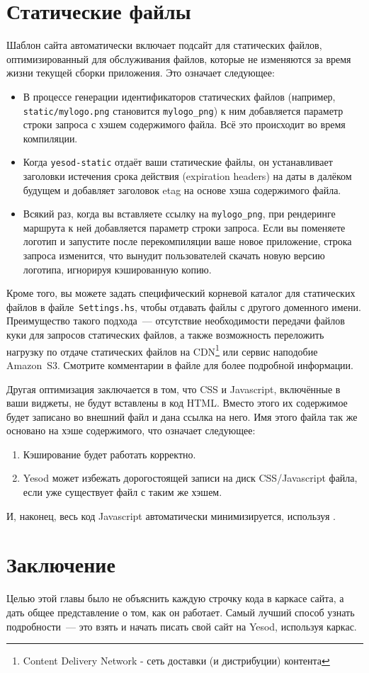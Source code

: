 \section{Статические файлы}
Шаблон сайта автоматически включает подсайт для статических файлов,
оптимизированный для обслуживания файлов, которые не изменяются за время жизни
текущей сборки приложения. Это означает следующее:
\begin{itemize}
  \item В процессе генерации идентификаторов статических файлов (например,
      \texttt{static/mylogo.png} становится \lstinline!mylogo_png!) к ним
      добавляется параметр строки запроса с хэшем содержимого файла. Всё
      это происходит во время компиляции.
  \item Когда \lstinline!yesod-static! отдаёт ваши статические файлы, он устанавливает
      заголовки истечения срока действия (expiration headers) на даты в далёком
      будущем и добавляет заголовок etag на основе хэша содержимого файла.
  \item Всякий раз, когда вы вставляете ссылку на \lstinline!mylogo_png!, при
      рендеринге маршрута к ней добавляется параметр строки запроса. Если вы
      поменяете логотип и запустите после перекомпиляции ваше новое приложение,
      строка запроса изменится, что вынудит пользователей скачать новую версию
      логотипа, игнорируя кэшированную копию.
\end{itemize}

Кроме того, вы можете задать специфический корневой каталог для статических
файлов в файле~\texttt{Settings.hs}, чтобы отдавать файлы с другого доменного
имени. Преимущество такого подхода~--- отсутствие необходимости передачи файлов
куки для запросов статических файлов, а также возможность переложить нагрузку по
отдаче статических файлов на CDN\footnote{Content Delivery Network - сеть
    доставки (и дистрибуции) контента} или сервис наподобие Amazon~S3.
Смотрите комментарии в файле для более подробной информации.

Другая оптимизация заключается в том, что CSS и Javascript, включённые в ваши
виджеты, не будут вставлены в код HTML. Вместо этого их содержимое будет записано
во внешний файл и дана ссылка на него.  Имя этого файла так же основано на
хэше содержимого, что означает следующее:
\begin{enumerate}
  \item Кэширование будет работать корректно.
  \item Yesod может избежать дорогостоящей записи на диск CSS/Javascript файла,
      если уже существует файл с таким же хэшем.
\end{enumerate}

И, наконец, весь код Javascript автоматически минимизируется, используя .

\section{Заключение}
Целью этой главы было не объяснить каждую строчку кода в каркасе сайта, а
дать общее представление о том, как он работает.  Самый лучший способ
узнать подробности~--- это взять и начать писать свой сайт на Yesod,
используя каркас.
